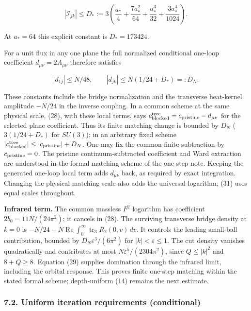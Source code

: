 \documentclass[11pt,a4paper]{article}
\begin{document}
\[|\mathcal I_{jk}|\le D_*:=3\left(
 \frac{a_*}{4}+\frac{7a_*^2}{64}+\frac{a_*^3}{32}
 +\frac{3a_*^4}{1024}\right). \tag{30}\]

At \(a_*=64\) this explicit constant is \(D_*=173424\).

For a unit flux in any one plane the full normalized conditional
one-loop coefficient \(d_{\mu\nu}=2A_{\mu\nu}\) therefore satisfies

\[|d_{1j}|\le N/48,\qquad
 |d_{jk}|\le N(1/24+D_*)=:D_N. \tag{31}\]

These constants include the bridge normalization and the transverse
heat-kernel amplitude \(-N/24\) in the inverse coupling. In a common
scheme at the same physical scale, (28), with these local terms, says
\(c_{\rm blocked}^{\rm tree}=c_{\rm pristine}-d_{\mu\nu}\) for the
selected plane coefficient. Thus its finite matching change is bounded
by \(D_N\) (\(3(1/24+D_*)\) for \(SU(3)\)); in an arbitrary fixed scheme
\(|c_{\rm blocked}^{\rm tree}|\le|c_{\rm pristine}|+D_N\). One may fix
the common finite subtraction by \(c_{\rm pristine}=0\). The pristine
continuum-subtracted coefficient and Ward extraction are understood in
the formal matching scheme of the one-step note. Keeping the generated
one-loop local term adds \(d_{\mu\nu}\) back, as required by exact
integration. Changing the physical matching scale also adds the
universal logarithm; (31) uses equal scales throughout.

\textbf{Infrared term.} The common massless \(F^2\) logarithm has
coefficient \(2b_0=11N/(24\pi^2)\); it cancels in (28). The surviving
transverse bridge density at \(k=0\) is
\(-N/24-N\operatorname{Re}\int_0^\infty\operatorname{tr}_3R_2(0,v)\,dv\).
It controls the leading small-ball contribution, bounded by
\(D_N\varepsilon^3/(6\pi^2)\) for \(|k|<\varepsilon\le1\). The cut
density vanishes quadratically and contributes at most
\(N\varepsilon^5/(2304\pi^2)\), since \(Q\le|k|^2\) and \(8+Q\ge8\).
Equation (29) supplies domination through the infrared limit, including
the orbital response. This proves finite one-step matching within the
stated formal scheme; depth-uniform (14) remains the next estimate.

\hypertarget{uniform-iteration-requirements-conditional}{%
\subsubsection{7.2. Uniform iteration requirements
(conditional)}\label{uniform-iteration-requirements-conditional}}
\end{document}
